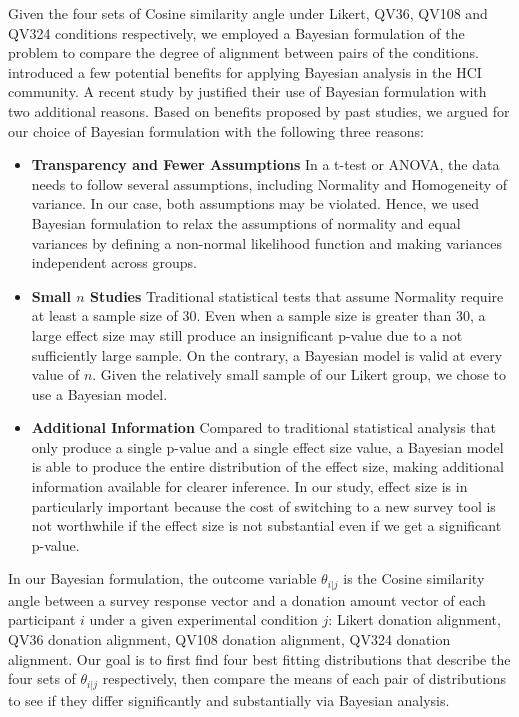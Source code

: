 Given the four sets of Cosine similarity angle under Likert, QV36, QV108 and QV324 conditions respectively, we employed a Bayesian formulation of the problem to compare the degree of alignment between pairs of the conditions. \textcite{kay2016researcher} introduced a few potential benefits for applying Bayesian analysis in the HCI community. A recent study by \textcite{xiao2019should} justified their use of Bayesian formulation with two additional reasons. Based on benefits proposed by past studies, we argued for our choice of Bayesian formulation with the following three reasons:

\begin{itemize}
    \item \textbf{Transparency and Fewer Assumptions} In a t-test or ANOVA, the data needs to follow several assumptions, including Normality and Homogeneity of variance. In our case, both assumptions may be violated. Hence, we used Bayesian formulation to relax the assumptions of normality and equal variances by defining a non-normal likelihood function and making variances independent across groups.
    \item \textbf{Small $n$ Studies} Traditional statistical tests that assume Normality require at least a sample size of 30. Even when a sample size is greater than 30, a large effect size may still produce an insignificant p-value due to a not sufficiently large sample. On the contrary, a Bayesian model is valid at every value of $n$. Given the relatively small sample of our Likert group, we chose to use a Bayesian model.
    \item \textbf{Additional Information} Compared to traditional statistical analysis that only produce a single p-value and a single effect size value, a Bayesian model is able to produce the entire distribution of the effect size, making additional information available for clearer inference. In our study, effect size is in particularly important because the cost of switching to a new survey tool is not worthwhile if the effect size is not substantial even if we get a significant p-value.
\end{itemize}

In our Bayesian formulation, the outcome variable $\theta_{i|j}$ is the Cosine similarity angle between a survey response vector and a donation amount vector of each participant $i$ under a given experimental condition $j$: Likert donation alignment, QV36 donation alignment, QV108 donation alignment, QV324  donation alignment. Our goal is to first find four best fitting distributions that describe the four sets of $\theta_{i|j}$ respectively, then compare the means of each pair of distributions to see if they differ significantly and substantially via Bayesian analysis. 

